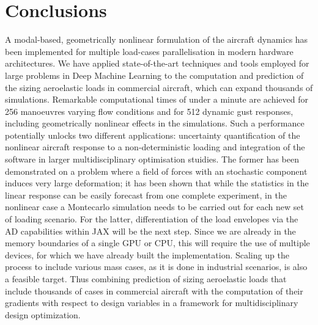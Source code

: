 \documentclass[11pt]{article}
\begin{document}
\section{Conclusions}
\label{sec:orgb486577}
A modal-based, geometrically nonlinear formulation of the aircraft dynamics has been implemented for multiple load-cases parallelisation in modern hardware architectures. We have applied state-of-the-art techniques and tools employed for large problems in Deep Machine Learning to the computation and prediction of the sizing aeroelastic loads in commercial aircraft, which can expand thousands of simulations. 
Remarkable computational times of under a minute are achieved for 256 manoeuvres varying flow conditions and for 512 dynamic gust responses, including geometrically nonlinear effects in the simulations.
Such a performance potentially unlocks two different applications: uncertainty quantification of the nonlinear aircraft response to a non-deterministic loading and integration of the software in larger multidisciplinary optimisation stuidies.
The former has been demonstrated on a problem where a field of forces with an stochastic component induces very large deformation; it has been shown that while the statistics in the linear response can be easily forecast from one complete experiment, in the nonlinear case a Montecarlo simulation needs to be carried out for each new set of loading scenario.
For the latter, differentiation of the load envelopes via the AD capabilities within JAX will be the next step. Since we are already in the memory boundaries of a single GPU or CPU, this will require the use of multiple devices, for which we have already built the implementation. 
Scaling up the process to include various mass cases, as it is done in industrial scenarios, is also a feasible target. Thus combining prediction of sizing aeroelastic loads that include thousands of cases in commercial aircraft with the computation of their gradients with respect to design variables in a framework for multidisciplinary design optimization.

\newpage




\end{document}
